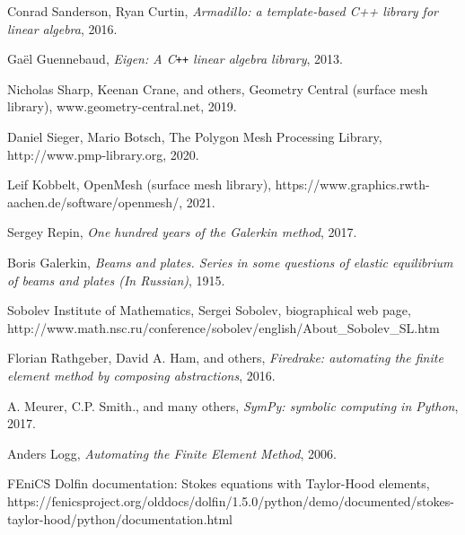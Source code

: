 \documentclass[11pt,a4paper]{memoir}
\begin{document}
\begin{thebibliography}{9}
Conrad Sanderson, Ryan Curtin,
\textit{Armadillo: a template-based C++ library for linear algebra},
2016.

Ga\"el Guennebaud,
\textit{Eigen: A C\texttt{++} linear algebra library},
2013.

Nicholas Sharp, Keenan Crane, and others,
Geometry Central (surface mesh library), www.geometry-central.net,
2019.

Daniel Sieger, Mario Botsch,
The Polygon Mesh Processing Library,
http://www.pmp-library.org,
2020.

Leif Kobbelt,
OpenMesh (surface mesh library),
https://www.graphics.rwth-aachen.de/software/openmesh/,
2021.

Sergey Repin,
\textit{One hundred  years of the Galerkin method},
2017.

Boris Galerkin,
\textit{Beams and plates. Series in some questions of elastic equilibrium of beams and plates (In Russian)},
1915.

Sobolev Institute of Mathematics,
Sergei Sobolev, biographical web page,
http://www.math.nsc.ru/conference/sobolev/english/About\_Sobolev\_SL.htm

Florian Rathgeber, David A. Ham, and others,
\textit{Firedrake: automating the finite element method by composing abstractions},
2016.


A. Meurer, C.P. Smith., and many others,
\textit{SymPy: symbolic computing in Python},
2017.

Anders Logg,
\textit{Automating the Finite Element Method},
2006.

FEniCS Dolfin documentation: Stokes equations with Taylor-Hood elements,
https://fenicsproject.org/olddocs/dolfin/1.5.0/python/demo/documented/stokes-taylor-hood/python/documentation.html

\end{thebibliography}
\end{document}
